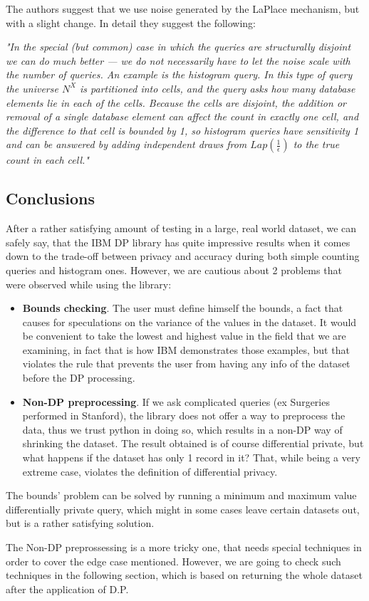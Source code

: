 The authors suggest that we use noise generated by the LaPlace mechanism, but with a slight change. In detail they suggest the following:

\textit{"In the special (but common) case in which the queries are structurally disjoint we can do much better — we do not necessarily have to let the noise scale with the number of queries. An example is the histogram query. In this type of query the universe $N^X$ is partitioned into cells, and the query asks how many database elements lie in each of the cells. Because the cells are disjoint, the addition or removal of a single database element can affect the count in exactly one cell, and the difference to that cell is bounded by 1, so histogram queries have sensitivity 1 and can be answered by adding independent draws from $Lap(\frac{1}{\epsilon})$ to the true count in each cell."}
\clearpage

\subsection{Conclusions}

After a rather satisfying amount of testing in a large, real world dataset, we can safely say, that the IBM DP library has quite impressive results when it comes down to the trade-off between privacy and accuracy during both simple counting queries and histogram ones. However, we are cautious about 2 problems that were observed while using the library:

\begin{itemize}
 \item \textbf{Bounds checking}. The user must define himself the bounds, a fact that causes for speculations on the variance of the values in the dataset. It would be convenient to take the lowest and highest value in the field that we are examining, in fact that is how IBM demonstrates those examples, but that violates the rule that prevents the user from having any info of the dataset before the DP processing.
 
 \item \textbf{Non-DP preprocessing}. If we ask complicated queries (ex Surgeries performed in Stanford), the library does not offer a way to preprocess the data, thus we trust python in doing so, which results in a non-DP way of shrinking the dataset. The result obtained is of course differential private, but what happens if the dataset has only 1 record in it? That, while being a very extreme case, violates the definition of differential privacy.
\end{itemize}

The bounds' problem can be solved by running a minimum and maximum value differentially private query, which might in some cases leave certain datasets out, but is a rather satisfying solution. 

The Non-DP preprossessing is a more tricky one, that needs special techniques in order to cover the edge case mentioned. However, we are going to check such techniques in the following section, which is based on returning the whole dataset after the application of D.P.

